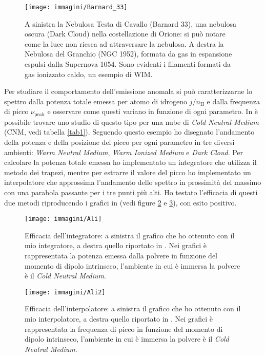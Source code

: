 \begin{figure}
	\centering
	\texttt{[image: immagini/Barnard\_33]}
	\caption{A sinistra la Nebulosa Testa di Cavallo (Barnard 33), una nebulosa oscura (Dark Cloud) nella costellazione di Orione: si può notare come la luce non riesca ad attraversare la nebulosa. 
		A destra la Nebulosa del Granchio (NGC 1952), formata da gas in espansione espulsi dalla Supernova 1054. Sono evidenti i filamenti formati da gas ionizzato caldo, un esempio di WIM.}
	\label{fig:Barnard_33}
\end{figure}
Per studiare il comportamento dell'emissione anomala si può caratterizzarne lo spettro dalla potenza totale emessa per atomo di idrogeno $j/n_{\mathrm{H}}$ e dalla frequenza di picco $\nu_{\mathrm{peak}}$ e osservare come questi variano in funzione di ogni parametro. In \textcite{Ali} è possibile trovare uno studio di questo tipo per una nube di \textit{Cold Neutral Medium} (CNM, vedi tabella \ref{tab1}). Seguendo questo esempio ho disegnato l'andamento della potenza e della posizione del picco per ogni parametro in tre diversi ambienti: \textit{Warm Neutral Medium}, \textit{Warm Ionized Medium} e \textit{Dark Cloud}. Per calcolare la potenza totale emessa ho implementato un integratore che utilizza il metodo dei trapezi, mentre per estrarre il valore del picco ho implementato un interpolatore che approssima l'andamento dello spettro in prossimità del massimo con una parabola passante per i tre punti più alti. Ho testato l'efficacia di questi due metodi riproducendo i grafici in \textcite{Ali} (vedi figure \ref{fig:Ali} e \ref{fig:Ali2}), con esito positivo.

\begin{figure}
\centering
\texttt{[image: immagini/Ali]}
\caption{Efficacia dell'integratore: a sinistra il grafico che ho ottenuto con il mio integratore, a destra quello riportato in \textcite{Ali}. Nei grafici è rappresentata la potenza emessa dalla polvere in funzione del momento di dipolo intrinseco, l'ambiente in cui è immersa la polvere è il \textit{Cold Neutral Medium}.}
\label{fig:Ali}
\end{figure}
\begin{figure}
	\centering
	\texttt{[image: immagini/Ali2]}
	\caption{Efficacia dell'interpolatore: a sinistra il grafico che ho ottenuto con il mio interpolatore, a destra quello riportato in \textcite{Ali}. Nei grafici è rappresentata la frequenza di picco in funzione del momento di dipolo intrinseco, l'ambiente in cui è immersa la polvere è il \textit{Cold Neutral Medium}.}
	\label{fig:Ali2}
\end{figure}


